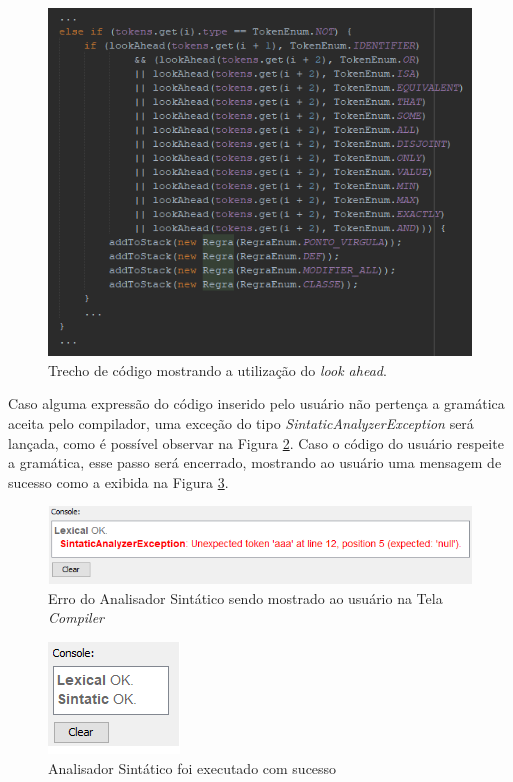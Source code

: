 \documentclass{bcc}
\begin{document}
\begin{figure}[H]
\centering
\includegraphics[width=.8\textwidth]{Figuras/codigo_lookahead.png}
\caption{Trecho de código mostrando a utilização do \textit{look ahead}. }
\label{fig:codigoLookAhead}
\end{figure}

Caso alguma expressão do código inserido pelo usuário não pertença a gramática aceita pelo compilador, uma exceção do tipo \textit{SintaticAnalyzerException} será lançada, como é possível observar na Figura \ref{fig:codigoErroSintatico}. Caso o código do usuário respeite a gramática, esse passo será encerrado, mostrando ao usuário uma mensagem de sucesso como a exibida na Figura \ref{fig:codigoSucessoSintatico}.

\begin{figure}[H]
\centering
\includegraphics[width=.8\textwidth]{Figuras/codigo_erro_sintatico.png}
\caption{Erro do Analisador Sintático sendo mostrado ao usuário na Tela \textit{Compiler}}
\label{fig:codigoErroSintatico}
\end{figure}

\begin{figure}[H]
\centering
\includegraphics[width=.3\textwidth]{Figuras/codigo_sucesso_sintatico.png}
\caption{Analisador Sintático foi executado com sucesso}
\label{fig:codigoSucessoSintatico}
\end{figure}
\end{document}
